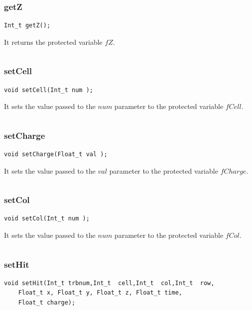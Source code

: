 \documentclass[a4paper]{book}
\begin{document}
\subsubsection{getZ}

\begin{lstlisting}
Int_t getZ();
\end{lstlisting}

It returns the protected variable $fZ$.

\[\]

\subsubsection{setCell}

\begin{lstlisting}
void setCell(Int_t num );
\end{lstlisting}

It sets the value passed to the $num$ parameter to the protected variable $fCell$.

\[\]

\subsubsection{setCharge}

\begin{lstlisting}
void setCharge(Float_t val );
\end{lstlisting}

It sets the value passed to the $val$ parameter to the protected variable $fCharge$.

\[\]

\subsubsection{setCol}

\begin{lstlisting}
void setCol(Int_t num );
\end{lstlisting}

It sets the value passed to the $num$ parameter to the protected variable $fCol$.

\[\]

\subsubsection{setHit}

\begin{lstlisting}
void setHit(Int_t trbnum,Int_t  cell,Int_t  col,Int_t  row,
	Float_t x, Float_t y, Float_t z, Float_t time,
	Float_t charge);
\end{lstlisting}
\end{document}
